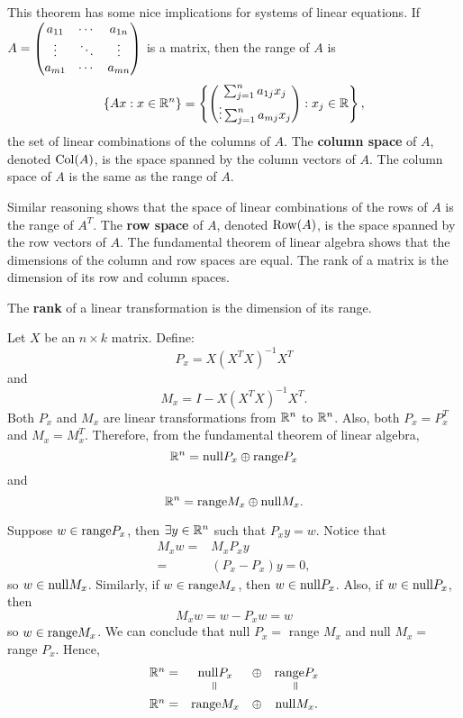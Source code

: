 This theorem has some nice implications for systems of linear
equations. If $A = \begin{pmatrix} {a}_{11} & \cdots & {a}_{1n} \\ \vdots & \ddots & \vdots \\ {a}_{m1} & \cdots & {a}_{mn} \end{pmatrix}$ is a matrix, then the range of $A$ is 
\begin{align*}
  \{Ax : x \in \mathbb{R}^n\} = \left\lbrace \begin{pmatrix} \sum_{j=1}^n
      a_{1j} x_j \\ 
      \vdots
      \sum_{j=1}^n a_{mj} x_j 
    \end{pmatrix} : x_j \in \mathbb{R} \right\rbrace,
\end{align*}
the set of linear combinations of the columns of $A$. 
The \textbf{column space} of $A$,
denoted $\mathrm{Col}(A)$, is the space spanned by the column vectors of
$A$. The column space of $A$ is the same as the range of $A$.

Similar reasoning shows that the space of linear combinations of the
rows of $A$ is the range of $A^T$. The \textbf{row space} of $A$,
denoted $\mathrm{Row} (A)$, is the space spanned by the row vectors of
$A$. The fundamental theorem of linear algebra shows that the
dimensions of the column and row spaces are equal. The rank of a
matrix is the dimension of its row and column spaces.
\begin{definition}
  The \textbf{rank} of a linear transformation is the dimension of its
  range.
\end{definition}

\begin{example}
  Let $X$ be an $n \times k$ matrix. Define:
  \[ P_x = X (X^T X)^{-1} X^T \]
  and 
  \[ M_x = I - X (X^T X)^{-1} X^T. \]
  Both $P_x$ and $M_x$ are linear transformations from $\mathbb{R}^n$ to
  $\mathbb{R}^n$. Also, both $P_x = P_x^T$ and $M_x = M_x^T$. Therefore, from
  the fundamental theorem of linear algebra, 
  \[ \mathbb{R}^n = \mathrm{null} P_x \oplus \mathrm{range}  P_x \]
  and
  \[ \mathbb{R}^n = \mathrm{range} M_x \oplus \mathrm{null}  M_x. \]
  
  Suppose $w \in \mathrm{range}  P_x$, then $\exists y \in \mathbb{R}^n$ such
  that $P_x y = w$. Notice that 
  \begin{align*}
    M_x w = & M_x P_x y \\
    = & (P_x - P_x)y = 0, 
  \end{align*}
  so $w \in \mathrm{null}  M_x$.  Similarly, if $w \in \mathrm{range} 
  M_x$, then $w \in \mathrm{null}  P_x$. Also, if $w \in \mathrm{null} 
  P_x$, then 
  \[ M_x w = w - P_x w = w \]
  so $w \in \mathrm{range}  M_x$. We can conclude that null $P_x = $
  range $M_x$ and null $M_x = $ range $P_x$. Hence,
  \[
  \begin{array}{cccc}
    \R^n = & \nulls  P_x & \oplus & \range  P_x \\
                & \verteq &            & \verteq \\
    \R^n = & \range M_x & \oplus & \nulls  M_x.
  \end{array}
  \]
  
\end{example}

